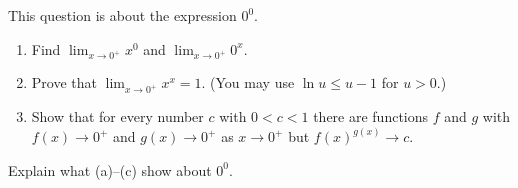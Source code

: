 This question is about the expression $0^0$.
\begin{enumerate}
\item[(a)] Find $\displaystyle\lim_{x\to0^+}x^0$ and $\displaystyle\lim_{x\to0^+}0^x$.
\item[(b)] Prove that $\displaystyle\lim_{x\to0^+}x^x=1$. (You may use $\ln u\le u-1$ for $u>0$.)
\item[(c)] Show that for every number $c$ with $0<c<1$ there are functions $f$ and $g$ with $f(x)\to0^+$ and $g(x)\to0^+$ as $x\to0^+$ but $f(x)^{g(x)}\to c$.
\end{enumerate}
Explain what (a)--(c) show about $0^0$.
